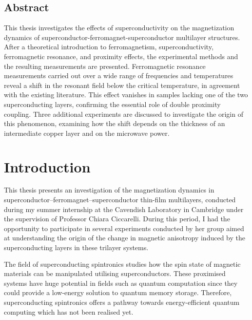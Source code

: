 \documentclass[12pt,a4paper,oneside,openany]{book}
\begin{document}
\section*{Abstract}
This thesis investigates the effects of superconductivity on the magnetization dynamics of superconductor-ferromagnet-superconductor multilayer structures. After a theoretical introduction to ferromagnetism, superconductivity, ferromagnetic resonance, and proximity effects, the experimental methods and the resulting measurements are presented. Ferromagnetic resonance measurements carried out over a wide range of frequencies and temperatures reveal a shift in the resonant field below the critical temperature, in agreement with the existing literature. This effect vanishes in samples lacking one of the two superconducting layers, confirming the essential role of double proximity coupling. Three additional experiments are discussed to investigate the origin of this phenomenon, examining how the shift depends on the thickness of an intermediate copper layer and on the microwave power.
\newpage
\null
\newpage

\chapter*{Introduction}
This thesis presents an investigation of the magnetization dynamics in superconductor–ferromagnet–superconductor thin-film multilayers, conducted during my summer internship at the Cavendish Laboratory in Cambridge under the supervision of Professor Chiara Ciccarelli. During this period, I had the opportunity to participate in several experiments conducted by her group aimed at understanding the origin of the change in magnetic anisotropy induced by the superconducting layers in these trilayer systems.

The field of superconducting spintronics studies how the spin state of magnetic materials can be manipulated utilising superconductors. These proximised systems have huge potential in fields such as quantum computation since they could provide a low-energy solution to quantum memory storage. Therefore, superconducting spintronics offers a pathway towards energy-efficient quantum computing which has not been realised yet.
\end{document}
